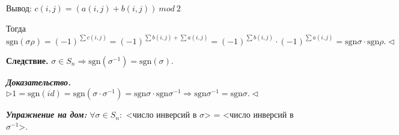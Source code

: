 Вывод: $c(i,j) = (a(i,j) + b(i,j))\ mod\ 2$

Тогда $\mathrm{sgn}(\sigma \rho) = (-1)^{\sum c(i,j)} = (-1)^{\sum b(i,j) + \sum a(i,j)} = (-1)^{\sum b(i,j)} \cdot (-1)^{\sum a(i,j)} = \mathrm{sgn} \sigma \cdot \mathrm{sgn} \rho. \lhd$

\vspace{\baselineskip}
\textbf{Следствие.} $\sigma \in S_n \Rightarrow \mathrm{sgn} (\sigma^{-1}) = \mathrm{sgn}(\sigma)$.

\vspace{\baselineskip}
\textbf{\textit{Доказательство.}} $\rhd 1 = \mathrm{sgn}(id) = \mathrm{sgn}(\sigma \cdot \sigma^{-1}) = \mathrm{sgn} \sigma \cdot \mathrm{sgn} \sigma^{-1} \Rightarrow \mathrm{sgn} \sigma^{-1} = \mathrm{sgn} \sigma. \lhd$

\vspace{\baselineskip}
\textbf{\textit{Упражнение на дом:}} $\forall \sigma \in S_n:$ <число инверсий в $\sigma$> = <число инверсий в $\sigma^{-1}$>.

